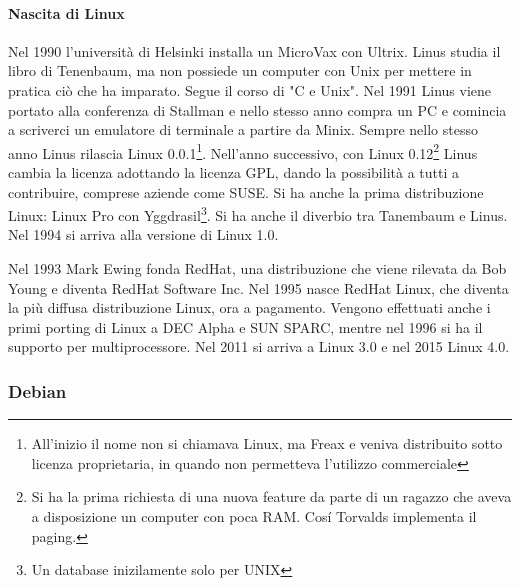 \paragraph*{Nascita di Linux} Nel 1990 l'universit\`a di Helsinki installa un MicroVax con Ultrix. Linus studia il libro di Tenenbaum, ma non possiede un computer con Unix per mettere in pratica ciò che ha imparato. Segue il corso di "C e Unix". Nel 1991 Linus viene portato alla conferenza di Stallman e nello stesso anno compra un PC e comincia a scriverci un emulatore di terminale a partire da Minix. Sempre nello stesso anno Linus rilascia Linux 0.0.1\footnote{All'inizio il nome non si chiamava Linux, ma Freax e veniva distribuito sotto licenza proprietaria, in quando non permetteva l'utilizzo commerciale}. Nell'anno successivo, con Linux 0.12\footnote{Si ha la prima richiesta di una nuova feature da parte di un ragazzo che aveva a disposizione un computer con poca RAM. Cosí Torvalds implementa il paging.} Linus cambia la licenza adottando la licenza GPL, dando la possibilit\`a a tutti a contribuire, comprese aziende come SUSE. Si ha anche la prima distribuzione Linux: Linux Pro con Yggdrasil\footnote{Un database inizilamente solo per UNIX}. Si ha anche il diverbio tra Tanembaum e Linus. Nel 1994 si arriva alla versione di Linux 1.0.

Nel 1993 Mark Ewing fonda RedHat, una distribuzione che viene rilevata da Bob Young e diventa RedHat Software Inc. Nel 1995 nasce RedHat Linux, che diventa la pi\`u diffusa distribuzione Linux, ora a pagamento. Vengono effettuati anche i primi porting di Linux a DEC Alpha e SUN SPARC, mentre nel 1996 si ha il supporto per multiprocessore. Nel 2011 si arriva a Linux 3.0 e nel 2015 Linux 4.0.

\subsubsection{Debian}

